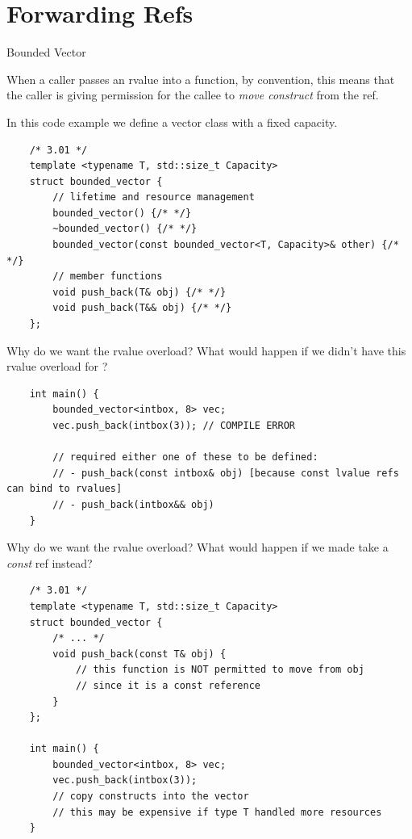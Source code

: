 \section{Forwarding Refs}

\begin{frame}[fragile]{Bounded Vector}
  \begin{sqt:result}
    When a caller passes an rvalue into a function,
    by convention, this means that the caller is giving permission 
    for the callee to \emph{move construct} from the ref.
  \end{sqt:result}
  In this code example we define a vector class with a fixed capacity.
  \begin{verbatim}
    /* 3.01 */
    template <typename T, std::size_t Capacity>
    struct bounded_vector {
        // lifetime and resource management
        bounded_vector() {/* */}
        ~bounded_vector() {/* */}
        bounded_vector(const bounded_vector<T, Capacity>& other) {/* */}
        // member functions
        void push_back(T& obj) {/* */}
        void push_back(T&& obj) {/* */}
    };
  \end{verbatim}
\end{frame}

\begin{frame}[fragile]{Why do we want the rvalue overload?}
  What would happen if we didn't have this rvalue overload for ?

  \begin{verbatim}
    int main() {
        bounded_vector<intbox, 8> vec;
        vec.push_back(intbox(3)); // COMPILE ERROR

        // required either one of these to be defined:
        // - push_back(const intbox& obj) [because const lvalue refs can bind to rvalues]
        // - push_back(intbox&& obj)
    }
  \end{verbatim}
\end{frame}

\begin{frame}[fragile]{Why do we want the rvalue overload?}
  What would happen if we made  take a \emph{const} ref instead?
  \begin{verbatim}
    /* 3.01 */
    template <typename T, std::size_t Capacity>
    struct bounded_vector {
        /* ... */
        void push_back(const T& obj) {
            // this function is NOT permitted to move from obj
            // since it is a const reference
        }
    };

    int main() {
        bounded_vector<intbox, 8> vec;
        vec.push_back(intbox(3));
        // copy constructs into the vector
        // this may be expensive if type T handled more resources
    }
  \end{verbatim}
\end{frame}

